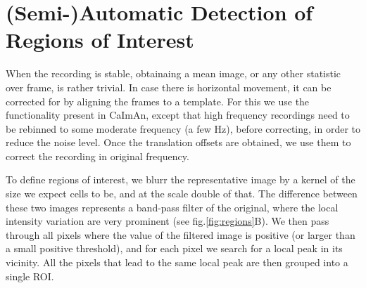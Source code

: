 \documentclass[a4paper,11pt,final]{article}
\begin{document}
\section{(Semi-)Automatic Detection of Regions of Interest}

When the recording is stable, obtainaing a mean image, or any other statistic over frame, is rather trivial. In case there is horizontal movement, it can be corrected for by aligning the frames to a template. For this we use the functionality present in CaImAn, except that high frequency recordings need to be rebinned to some moderate frequency (a few Hz), before correcting, in order to reduce the noise level. Once the translation offsets are obtained, we use them to correct the recording in original frequency.

To define regions of interest, we blurr the representative image by a kernel of the size we expect cells to be, 
and at the scale double of that.
The difference between these two images represents a band-pass filter of the original, where the local intensity variation are very prominent (see fig.\ref{fig:regions}B).
We then pass through all pixels where the value of the filtered image is positive (or larger than a small positive threshold), and for each pixel we search for a local peak in its vicinity. 
All the pixels that lead to the same local peak are then grouped into a single ROI.
\end{document}
